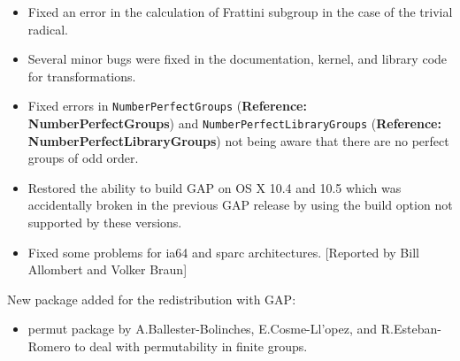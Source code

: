 \documentclass[a4paper,11pt]{report}
\begin{document}
{{\begin{itemize}
homomorphic images, providing fallback to a default algorithm. 
\item  Fixed an error in the calculation of Frattini subgroup in the case of the
trivial radical. 
\item  Several minor bugs were fixed in the documentation, kernel, and library code
for transformations. 
\item  Fixed errors in \texttt{NumberPerfectGroups} (\textbf{Reference: NumberPerfectGroups}) and \texttt{NumberPerfectLibraryGroups} (\textbf{Reference: NumberPerfectLibraryGroups}) not being aware that there are no perfect groups of odd order. 
\item  Restored the ability to build \textsf{GAP} on OS X 10.4 and 10.5 which was accidentally broken in the previous \textsf{GAP} release by using the build option not supported by these versions. 
\item  Fixed some problems for ia64 and sparc architectures. [Reported by Bill
Allombert and Volker Braun] 
\end{itemize}
 New package added for the redistribution with \textsf{GAP}: 
\begin{itemize}
\item  \textsf{permut} package by A.Ballester-Bolinches, E.Cosme-Ll{\a'o}pez, and R.Esteban-Romero to
deal with permutability in finite groups. 
\end{itemize}
 }

 
}
\end{document}
